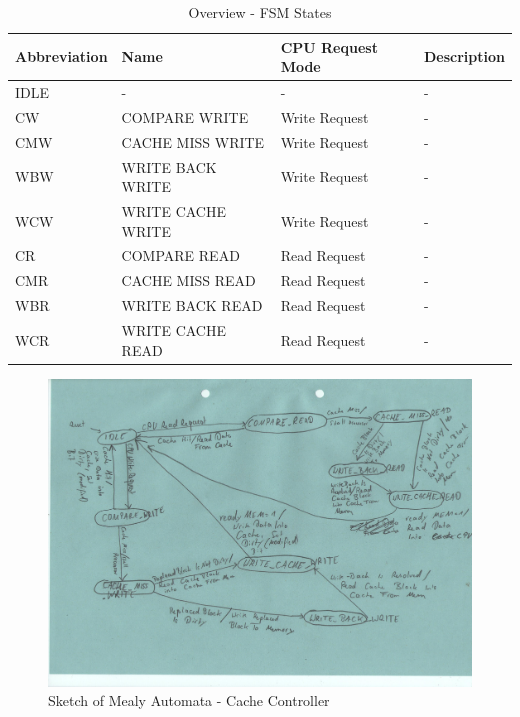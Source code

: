\begin{table}
\caption{Overview - FSM States}
\label{tab:tableFSM}
\begin{tabular}{llll}
\hline %
Abbreviation & Name & CPU Request Mode & Description \\
\hline %
IDLE 	& -					& - 			& - \\
CW		& COMPARE WRITE		& Write Request & - \\
CMW		& CACHE MISS WRITE	& Write Request & - \\
WBW		& WRITE BACK WRITE	& Write Request & - \\
WCW		& WRITE CACHE WRITE	& Write Request & - \\
CR		& COMPARE READ		& Read Request 	& - \\
CMR		& CACHE MISS READ	& Read Request 	& - \\
WBR		& WRITE BACK READ	& Read Request 	& - \\
WCR		& WRITE CACHE READ	& Read Request 	& - \\
\hline %
\end{tabular} 
\end{table}


\begin{figure}
	\centering
	\includegraphics[scale=.8]{pictures/sketch_mealyAutomata}
	\caption{Sketch of Mealy Automata - Cache Controller}
	\label{fig:sketchMealyAutomata}
\end{figure}
